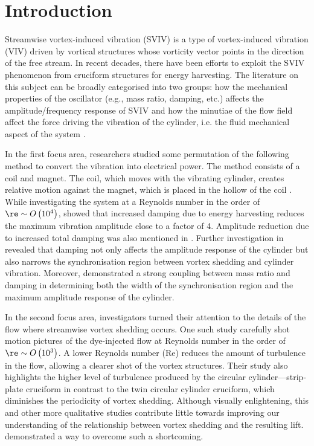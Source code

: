 \documentclass[a4paper,fleqn]{cas-sc}
\begin{document}
\section{Introduction} \label{sec:intro}
Streamwise vortex-induced vibration (SVIV) is a type of vortex-induced vibration (VIV) driven by vortical structures whose vorticity vector points in the direction of the free stream. In recent decades, there have been efforts to exploit the SVIV phenomenon from cruciform structures for energy harvesting. The literature on this subject can be broadly categorised into two groups: how the mechanical properties of the oscillator (e.g., mass ratio, damping, etc.) affects the amplitude/frequency response of SVIV \citep{Koide2009,Koide2013,Nguyen2012} and how the minutiae of the flow field affect the force driving the vibration of the cylinder, i.e. the fluid mechanical aspect of the system \citep{Deng2007,Koide2017,Zhao2018a}.

In the first focus area, researchers studied some permutation of the following method to convert the vibration into electrical power. The method consists of a coil and magnet. The coil, which moves with the vibrating cylinder, creates relative motion against the magnet, which is placed in the hollow of the coil \citep{Koide2009}. While investigating the system at a Reynolds number in the order of $\re \sim O \left( 10^{4} \right)$, \citet{Koide2009} showed that increased damping due to energy harvesting reduces the maximum vibration amplitude close to a factor of 4. Amplitude reduction due to increased total damping was also mentioned in \citet{Bernitsas2008a,Bernitsas2008b,Bernitsas2009}. Further investigation in \citet{Nguyen2012} revealed that damping not only affects the amplitude response of the cylinder but also narrows the synchronisation region between vortex shedding and cylinder vibration. Moreover, \citet{Nguyen2012} demonstrated a strong coupling between mass ratio and damping in determining both the width of the synchronisation region and the maximum amplitude response of the cylinder.

In the second focus area, investigators turned their attention to the details of the flow where streamwise vortex shedding occurs. One such study carefully shot motion pictures of the dye-injected flow \citep{Koide2017} at Reynolds number in the order of $\re \sim O\left( 10^{3} \right)$. A lower Reynolds number (Re) reduces the amount of turbulence in the flow, allowing a clearer shot of the vortex structures. Their study also highlights the higher level of turbulence produced by the circular cylinder---strip-plate cruciform in contrast to the twin circular cylinder cruciform, which diminishes the periodicity of vortex shedding. Although visually enlightening, this and other more qualitative studies contribute little towards improving our understanding of the relationship between vortex shedding and the resulting lift. \citet{Deng2007} demonstrated a way to overcome such a shortcoming.
\end{document}
